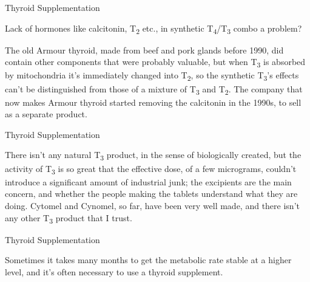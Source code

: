 \documentclass[11pt,oneside,openany,extrafontsizes]{memoir}
\begin{document}
\begin{qaexchange}{Thyroid Supplementation}

    \begin{question}
        Lack of hormones like calcitonin, T\textsubscript{2} etc., in synthetic T\textsubscript{4}/T\textsubscript{3} combo a problem?
    \end{question}

    \begin{answer}
        The old Armour thyroid, made from beef and pork glands before 1990, did contain other components that were probably valuable, but when T\textsubscript{3} is absorbed by mitochondria it's immediately changed into T\textsubscript{2}, so the synthetic T\textsubscript{3}'s effects can't be distinguished from those of a mixture of T\textsubscript{3} and T\textsubscript{2}. The company that now makes Armour thyroid started removing the calcitonin in the 1990s, to sell as a separate product.
    \end{answer}
\end{qaexchange}

\begin{standalonequote}{Thyroid Supplementation}

    \begin{answer}
        There isn't any natural T\textsubscript{3} product, in the sense of biologically created, but the activity of T\textsubscript{3} is so great that the effective dose, of a few micrograms, couldn't introduce a significant amount of industrial junk; the excipients are the main concern, and whether the people making the tablets understand what they are doing. Cytomel and Cynomel, so far, have been very well made, and there isn't any other T\textsubscript{3} product that I trust.
    \end{answer}
\end{standalonequote}

\begin{standalonequote}{Thyroid Supplementation}

    \begin{answer}
        Sometimes it takes many months to get the metabolic rate stable at a higher level, and it's often necessary to use a thyroid supplement.
    \end{answer}
\end{standalonequote}
\end{document}
